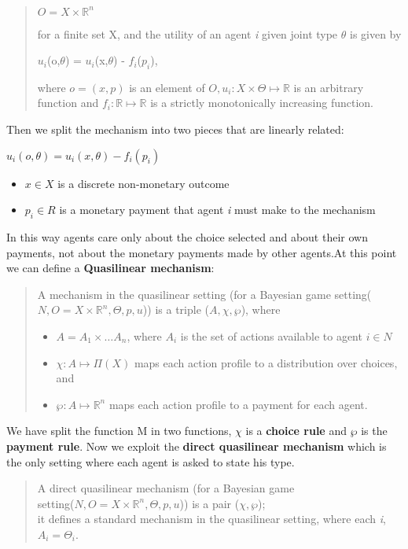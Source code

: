 \documentclass{article}
\begin{document}
{\begin{quote}
    \begin{center}
        $O = X \times \mathbb{R}^n$
    \end{center}
    for a finite set X, and the utility of an agent \textit{i} given joint type $\theta$ is given by
    \begin{center}
        $u_i$(o,$\theta$) = $u_i$(x,$\theta$) - $f_i$($p_i$),
    \end{center}
    where $o = (x,p)$ is an element of $O, u_i : X \times \Theta \mapsto \mathbb{R}$ is an arbitrary function  and $f_i : \mathbb{R} \mapsto \mathbb{R}$ is a strictly monotonically increasing function.
\end{quote}
Then we split the mechanism into two pieces that are linearly related:
\begin{center}
    $u_i(o,\theta) = u_i(x,\theta) - f_i(p_i)$
    \begin{itemize}
        \item $x \in X$ is a discrete non-monetary outcome
        \item $p_i \in R$ is a monetary payment that agent \textit{i} must make to the mechanism
    \end{itemize}
\end{center}
In this way agents care only about the choice selected and about their own payments, not about the monetary payments made by other agents.\newpage At this point we can define a \textbf{Quasilinear mechanism}:
\begin{quote}
    A mechanism in the quasilinear setting (for a Bayesian game setting($N,O = X \times \mathbb{R}^n,\Theta,p,u$)) is a triple ($A,\chi,\wp$), where
    \begin{itemize}
        \item $A = A_1 \times \dots A_n$, where $A_i$ is the set of actions available to agent $i \in N$
        \item $\chi : A \mapsto \Pi(X)$ maps each action profile to a distribution over choices, and
        \item $\wp : A \mapsto \mathbb{R}^n$ maps each action profile to a payment for each agent.
    \end{itemize}
\end{quote}
We have split the function M in two functions, $\chi$ is a \textbf{choice rule} and $\wp$ is the \textbf{payment rule}. Now we exploit the \textbf{direct quasilinear mechanism} which is the only setting where each agent is asked to state his type.
\begin{quote}
    A direct quasilinear mechanism (for a Bayesian game\\ setting($N,O = X \times \mathbb{R}^n,\Theta,p,u$)) is a pair ($\chi,\wp$);\\ it defines a standard mechanism in the quasilinear setting, where each \textit{i}, $A_i = \Theta_i$.

\end{quote}}
\end{document}

